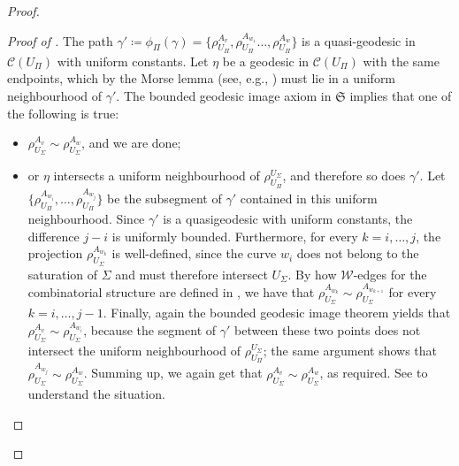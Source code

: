 \documentclass[svgnames]{amsart}
\theoremstyle{plain}
\newenvironment{claimproof}{\renewcommand{\qedsymbol}{$\blacksquare$}\begin{proof}}{\end{proof}}
\theoremstyle{definition}
\newcommand{\frakS}{\mathfrak S}
\newcommand{\C}[1]{\mathcal{C}(#1)}
\newcommand{\W}{\mathcal{W}}
\begin{document}
\begin{proof}
    \begin{claimproof}[Proof of ] The path $\gamma'\coloneq \phi_{\Pi}(\gamma)= \{\rho^{A_{v}}_{U_\Pi},\rho^{A_{w_1}}_{U_\Pi}\ldots,\rho^{A_{w}}_{U_\Pi}\}$ is a quasi-geodesic in $\C{U_\Pi}$ with uniform constants. Let $\eta$ be a geodesic in $\C{U_\Pi}$ with the same endpoints, which by the Morse lemma (see, e.g., \cite[III.H.1.7]{BH}) must lie in a uniform neighbourhood of $\gamma'$. The bounded geodesic image axiom in $\frakS$ implies that one of the following is true:
    \begin{itemize}
        \item $\rho^{A_v}_{U_\Sigma}\sim \rho^{A_w}_{U_\Sigma}$, and we are done;
        \item or $\eta$ intersects a uniform neighbourhood of $\rho^{U_\Sigma}_{U_\Pi}$, and therefore so does $\gamma'$. Let $\{\rho^{A_{w_i}}_{U_\Pi},\ldots,\rho^{A_{w_j}}_{U_\Pi}\}$ be the subsegment of $ \gamma'$ contained in this uniform neighbourhood. Since $\gamma'$ is a quasigeodesic with uniform constants, the difference $j-i$ is uniformly bounded. Furthermore, for every $k=i,\ldots, j$, the projection $\rho^{A_{w_k}}_{U_\Sigma}$ is well-defined, since the curve $w_i$ does not belong to the saturation of $\Sigma$ and must therefore intersect $U_\Sigma$. By how $\W$-edges for the combinatorial structure are defined in \cite[Definition 4.10]{converse}, we have that $\rho^{A_{w_k}}_{U_\Sigma}\sim \rho^{A_{w_{k+1}}}_{U_\Sigma}$ for every $k=i,\ldots, j-1$. Finally, again the bounded geodesic image theorem yields that $\rho^{A_{v}}_{U_\Sigma}\sim \rho^{A_{w_{i}}}_{U_\Sigma}$, because the segment of $\gamma'$ between these two points does not intersect the uniform neighbourhood of $\rho^{U_\Sigma}_{U_\Pi}$; the same argument shows that $\rho^{A_{w_j}}_{U_\Sigma}\sim \rho^{A_{w}}_{U_\Sigma}$. Summing up, we again get that $\rho^{A_v}_{U_\Sigma}\sim \rho^{A_w}_{U_\Sigma}$, as required. See  to understand the situation. \qedhere
    \end{itemize} 
    \end{claimproof}
    

\end{proof}
\end{document}
